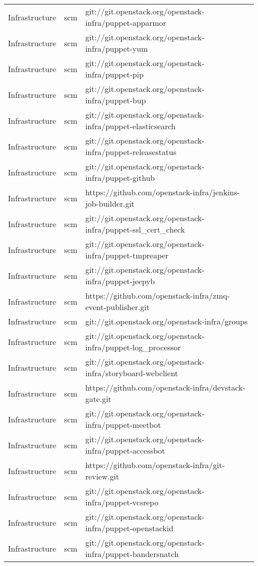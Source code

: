 \begin{center}
\begin{longtable}{|p{4cm}|p{1cm}|p{10cm}|}
Infrastructure&scm&git://git.openstack.org/openstack-infra/puppet-apparmor\\ 
Infrastructure&scm&git://git.openstack.org/openstack-infra/puppet-yum\\ 
Infrastructure&scm&git://git.openstack.org/openstack-infra/puppet-pip\\ 
Infrastructure&scm&git://git.openstack.org/openstack-infra/puppet-bup\\ 
Infrastructure&scm&git://git.openstack.org/openstack-infra/puppet-elasticsearch\\ 
Infrastructure&scm&git://git.openstack.org/openstack-infra/puppet-releasestatus\\ 
Infrastructure&scm&git://git.openstack.org/openstack-infra/puppet-github\\ 
Infrastructure&scm&https://github.com/openstack-infra/jenkins-job-builder.git\\ 
Infrastructure&scm&git://git.openstack.org/openstack-infra/puppet-ssl\_cert\_check\\ 
Infrastructure&scm&git://git.openstack.org/openstack-infra/puppet-tmpreaper\\ 
Infrastructure&scm&git://git.openstack.org/openstack-infra/puppet-jeepyb\\ 
Infrastructure&scm&https://github.com/openstack-infra/zmq-event-publisher.git\\ 
Infrastructure&scm&git://git.openstack.org/openstack-infra/groups\\ 
Infrastructure&scm&git://git.openstack.org/openstack-infra/puppet-log\_processor\\ 
Infrastructure&scm&git://git.openstack.org/openstack-infra/storyboard-webclient\\ 
Infrastructure&scm&https://github.com/openstack-infra/devstack-gate.git\\ 
Infrastructure&scm&git://git.openstack.org/openstack-infra/puppet-meetbot\\ 
Infrastructure&scm&git://git.openstack.org/openstack-infra/puppet-accessbot\\ 
Infrastructure&scm&https://github.com/openstack-infra/git-review.git\\ 
Infrastructure&scm&git://git.openstack.org/openstack-infra/puppet-vcsrepo\\ 
Infrastructure&scm&git://git.openstack.org/openstack-infra/puppet-openstackid\\ 
Infrastructure&scm&git://git.openstack.org/openstack-infra/puppet-bandersnatch\\ 

\end{longtable}
\end{center}
